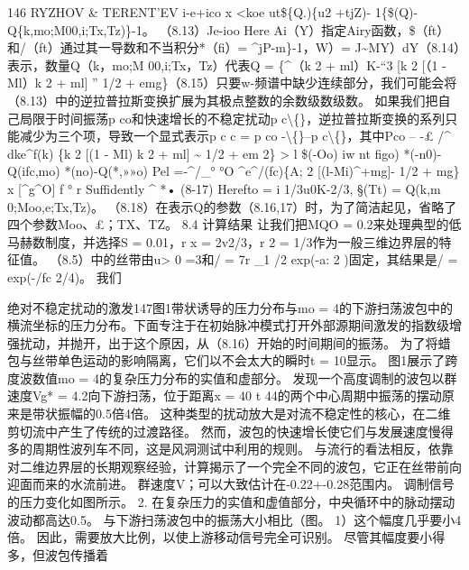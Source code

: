 \documentclass[UTF8,11pt,a4paper,openany,fontset=fandol]{ctexbook}
\begin{document}
146 RYZHOV \& TERENT'EV i-e+ico x <koe ut\$\{Q.)\{u2 +tjZ)- 1\{\$(Q)-Q\{k,mo;M00,i;Tx,Tz)\}-1。 （8.13）Je-ioo Here Ai（Y）指定Airy函数，\$（ft）和/（ft）通过其一导数和不当积分*（fi）= \textasciicircum{}jP-m\}-1，W）= J\textasciitilde{}MY）dY（8.14）表示，数量Q（k，mo;M 00,i;Tx，Tz）代表Q = \{\textasciicircum{}（k 2 + ml）K-“3 [k 2 [（1 - Ml）k 2 + ml] ” 1/2 + emg\}（8.15）只要w-频谱中缺少连续部分，我们可能会将（8.13）中的逆拉普拉斯变换扩展为其极点整数的余数级数级数。 如果我们把自己局限于时间振荡p co和快速增长的不稳定扰动p c\textbackslash\{\}，逆拉普拉斯变换的系列只能减少为三个项，导致一个显式表示p c c = p co -\textbackslash\{\}--p c\textbackslash\{\}，其中Pco -- -£ /\textasciicircum{} dke\textasciicircum{}f(k) \{k 2 [(1 - Ml) k 2 + ml] \textasciitilde{} 1/2 + em 2\} > l \$(-Oo) iw nt figo) *(-n0)-Q(ifc,mo) *(no)-Q(*,»»o) Pel =-\textasciicircum{}/\_° °O \textasciicircum{}e\textasciicircum{}/(fc)\{A; 2 [(l-Mi)\textasciicircum{}+mg]- 1/2 + mg\} x [\textasciicircum{}g\textasciicircum{}O] f ° r Suffidently \textasciicircum{} *• (8-17) Herefto = i 1/3u0K-2/3, §(Tt) = Q(k,m 0;Moo,e;Tx,Tz)。 （8.18）在表示Q的参数（8.16,17）时，为了简洁起见，省略了四个参数Moo、£；TX、TZ。 8.4 计算结果 让我们把MQO = 0.2来处理典型的低马赫数制度，并选择S = 0.01，r x = 2v2/3，r 2 = 1/3作为一般三维边界层的特征值。 （8.5）中的丝带由u> 0 =3和/ = 7r \_1 /2 exp(-a: 2 )固定，其结果是/ = exp(-/fc 2/4)。 我们

绝对不稳定扰动的激发147图1带状诱导的压力分布与mo = 4的下游扫荡波包中的横流坐标的压力分布。下面专注于在初始脉冲模式打开外部源期间激发的指数级增强扰动，并抛开，出于这个原因，从（8.16）开始的时间期间的振荡。 为了将蜡包与丝带单色运动的影响隔离，它们以不会太大的瞬时t = 10显示。 图1展示了跨度波数值mo = 4的复杂压力分布的实值和虚部分。 发现一个高度调制的波包以群速度Vg* = 4.2向下游扫荡，位于距离x = 40 t 44的两个中心周期中振荡的摆动原来是带状振幅的0.5倍4倍。 这种类型的扰动放大是对流不稳定性的核心，在二维剪切流中产生了传统的过渡路径。 然而，波包的快速增长使它们与发展速度慢得多的周期性波列车不同，这是风洞测试中利用的规则。 与流行的看法相反，依靠对二维边界层的长期观察经验，计算揭示了一个完全不同的波包，它正在丝带前向迎面而来的水流前进。 群速度V；可以大致估计在-0.22+-0.28范围内。 调制信号的压力变化如图所示。 2. 在复杂压力的实值和虚值部分，中央循环中的脉动摆动波动都高达0.5。 与下游扫荡波包中的振荡大小相比（图。 1）这个幅度几乎要小4倍。 因此，需要放大比例，以使上游移动信号完全可识别。 尽管其幅度要小得多，但波包传播着
\end{document}
